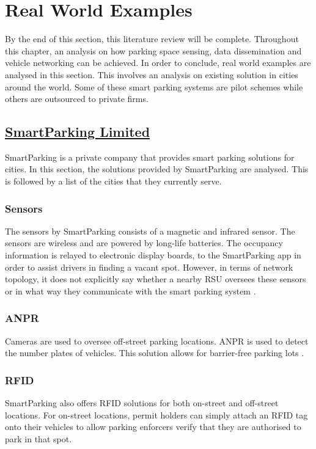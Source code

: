 \pagebreak

\section{Real World Examples}
By the end of this section, this literature review will be complete. Throughout this chapter, an analysis on how parking space sensing, data dissemination and vehicle networking can be achieved. In order to conclude, real world examples are analysed in this section. This involves an analysis on existing solution in cities around the world. Some of these smart parking systems are pilot schemes while others are outsourced to private firms.

\subsection*{\underline{SmartParking Limited}}
SmartParking \citep{18} is a private company that provides smart parking solutions for cities. In this section, the solutions provided by SmartParking are analysed. This is followed by a list of the cities that they currently serve.

\subsubsection{Sensors}
The sensors by SmartParking consists of a magnetic and infrared sensor. The sensors are wireless and are powered by long-life batteries. The occupancy information is relayed to electronic display boards, to the SmartParking app in order to assist drivers in finding a vacant spot. However, in terms of network topology, it does not explicitly say whether a nearby \ac{RSU} oversees these sensors or in what way they communicate with the smart parking system \citep{2017SensorsSmartParking}.

\subsubsection{ANPR}
Cameras are used to oversee off-street parking locations. \ac{ANPR} is used to detect the number plates of vehicles. This solution allows for barrier-free parking lots \citep{2017ANPRSmartParking}.

\subsubsection{RFID}
SmartParking also offers \ac{RFID} solutions for both on-street and off-street locations. For on-street locations, permit holders can simply attach an \ac{RFID} tag onto their vehicles to allow parking enforcers verify that they are authorised to park in that spot.

